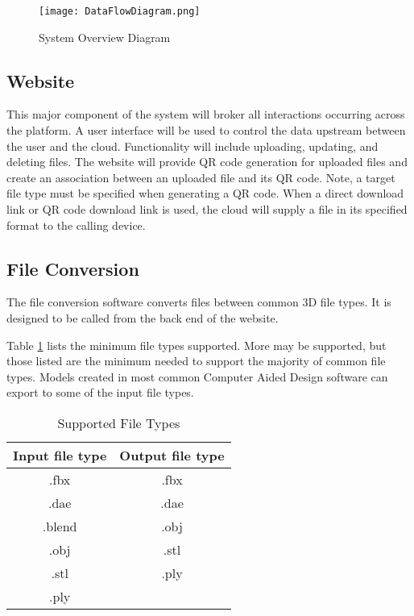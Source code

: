 \begin{figure}[H]
	\centering
	\texttt{[image: DataFlowDiagram.png]}
	\caption{System Overview Diagram} 
	\label{fig:UMLSystemOverview}	
\end{figure}

\subsection{Website}
This major component of the system will broker all interactions occurring across the platform. A user interface will be used to control the data upstream between the user and the cloud. Functionality will include uploading, updating, and deleting files. The website will provide QR code generation for uploaded files and create an association between an uploaded file and its QR code. Note, a target file type must be specified when generating a QR code. When a direct download link or QR code download link is used, the cloud will supply a file in its specified format to the calling device. 


\subsection{File Conversion}
The file conversion software converts files between common 3D file types. It is designed to be called from the back end of the website.

Table \ref{tab:suportedfiletypes} lists the minimum file types supported.  More may be supported, but those listed are the minimum needed to support the majority of common file types.  
Models created in most common Computer Aided Design software can export to some of the input file types.

\begin{table}[!h]
    \centering
    \begin{tabular}{| c | c |}
        \hline
        Input file type & Output file type \\
        \hline
        .fbx & .fbx \\
        .dae & .dae \\
        .blend & .obj \\ 
        .obj & .stl \\
        .stl & .ply \\
        .ply & \\
        \hline
    \end{tabular}
    \caption{Supported File Types}
    \label{tab:suportedfiletypes}
\end{table}

